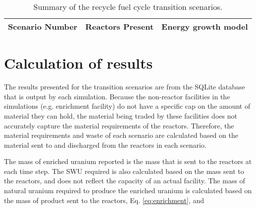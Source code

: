 \begin{table}[ht]
    \centering
    \caption{Summary of the recycle fuel cycle transition scenarios.}
    \label{tab:scenarios_recycle}
    \begin{tabular}{l l l}
            \hline
            Scenario Number & Reactors Present & Energy growth model\\\hline

            \hline
    \end{tabular}
\end{table}

\section{Calculation of results}
The results presented for the transition scenarios are from the SQLite database 
that is output by each \Cyclus simulation. Because the non-reactor facilities 
in the simulations (e.g. enrichment facility) do not have a specific cap on the 
amount of material they can hold, the material being traded by these facilities 
does not accurately capture the material requirements of the reactors. Therefore, 
the material requirements and waste of each scenario are calculated based on 
the material sent to and discharged from the reactors in each scenario. 

The mass of enriched uranium reported is the mass that is sent to the reactors 
at each time step. The \gls{SWU} required is also calculated based on the 
mass sent to the reactors, and does not reflect the capacity of an actual 
facility. The mass of natural uranium required to produce the enriched uranium 
is calculated based on the mass of product sent to the reactors, Eq. \ref{eq:enrichment},
and 
